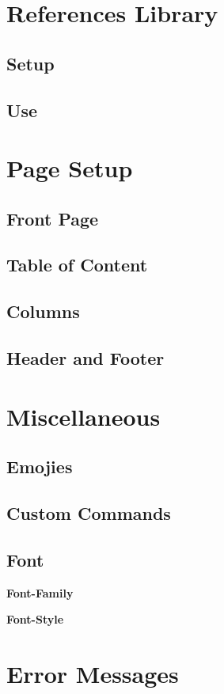 \documentclass{article}
\newcommand{\myblock}{} %
\begin{document}
\section{References Library}
\subsection{Setup}
\subsection{Use}

\section{Page Setup}
\subsection{Front Page}
\subsection{Table of Content}
\subsection{Columns}
\subsection{Header and Footer}
\newpage

\section{Miscellaneous}
\subsection{Emojies}
\subsection{Custom Commands}
\subsection{Font}
\myblock{
    {\large\textbf{Font-Family}}
    
    \label{secc:font-family-sheet}
}
\myblock{
    {\large\textbf{Font-Style}}
    
    \label{secc:font-style-sheet}
}

\newpage

\section{Error Messages}
\end{document}
